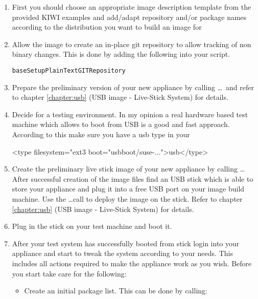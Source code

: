 \begin{enumerate}
\item First you should choose an appropriate image description template from
      the provided KIWI examples and add/adapt repository and/or
      package names according to the distribution you want to
      build an image for
\item Allow the image to create an in-place git repository to
      allow tracking of non binary changes. This is done by adding
      the following into your  script.

\begin{verbatim}
baseSetupPlainTextGITRepository
\end{verbatim}

\item Prepare the preliminary version of your new appliance by
      calling  \ldots\ and refer to chapter \ref{chapter:usb}
      (USB image - Live-Stick System) for details.
\item Decide for a testing environment. In my opinion a real
      hardware based test machine which allows to boot from USB
      is a good and fast approach. According to this make sure
      you have a usb type in your 

\begin{xml}
<type filesystem="ext3 boot="usbboot/suse-...">usb</type>
\end{xml}

\item Create the preliminary live stick image of your new appliance
      by calling \linebreak[3] \ldots After successful creation
      of the image files find an USB stick which is able to store
      your appliance and plug it into a free USB port on your image
      build machine. Use the  \ldots call to deploy
      the image on the stick. Refer to chapter \ref{chapter:usb}
      (USB image - Live-Stick System) for details.
\item Plug in the stick on your test machine and boot it.
\item After your test system has successfully booted from stick login
      into your appliance and start to tweak the system according to
      your needs. This includes all actions required to make the
      appliance work as you wish. Before you start take care for
      the following:
      \begin{itemize}
      \item Create an initial package list. This can be done by calling:


\end{itemize}
\end{enumerate}
